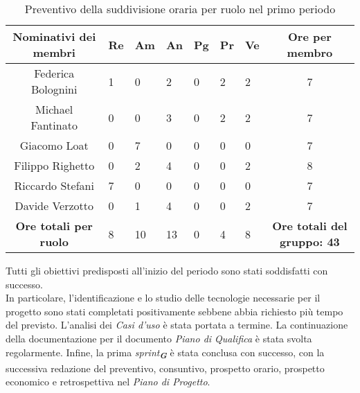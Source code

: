 \begin{table}[h!]
    \centering
    \renewcommand{\arraystretch}{1.5}
    \begin{tabularx}{\textwidth}{|c|X|X|X|X|X|X|c|}\hline
    \rowcolor[HTML]{FFD700} 
    \textbf{Nominativi dei membri} & \textbf{Re} & \textbf{Am} & \textbf{An} & \textbf{Pg} & \textbf{Pr} & \textbf{Ve} & \textbf{Ore per membro} \\ \hline
    Federica Bolognini  & 1 & 0 & 2 & 0 & 2 & 2 & 7 \\ \hline
    Michael Fantinato   & 0 & 0 & 3 & 0 & 2 & 2 & 7 \\ \hline
    Giacomo Loat        & 0 & 7 & 0 & 0 & 0 & 0 & 7 \\ \hline
    Filippo Righetto    & 0 & 2 & 4 & 0 & 0 & 2 & 8 \\ \hline
    Riccardo Stefani    & 7 & 0 & 0 & 0 & 0 & 0 & 7 \\ \hline
    Davide Verzotto     & 0 & 1 & 4 & 0 & 0 & 2 & 7 \\ \hline
    \rowcolor[HTML]{FFD700} 
    \textbf{Ore totali per ruolo} & 8 & 10 & 13 & 0 & 4 & 8 & \textbf{Ore totali del gruppo: 43} \\ \hline
    \end{tabularx}
    \caption{Preventivo della suddivisione oraria per ruolo nel primo periodo}
\end{table}

Tutti gli obiettivi predisposti all'inizio del periodo sono stati soddisfatti con successo.\\
In particolare, l'identificazione e lo studio delle tecnologie necessarie per il progetto sono stati completati positivamente sebbene abbia richiesto più tempo del previsto. L'analisi dei \textit{Casi d'uso} è stata portata a termine. La continuazione della documentazione per il documento \textit{Piano di Qualifica} è stata svolta regolarmente. Infine, la prima {\emph{sprint}}\textsubscript{\textit{\textbf{G}}} è stata conclusa con successo, con la successiva redazione del preventivo, consuntivo, prospetto orario, prospetto economico e retrospettiva nel \textit{Piano di Progetto}.

\newpage
